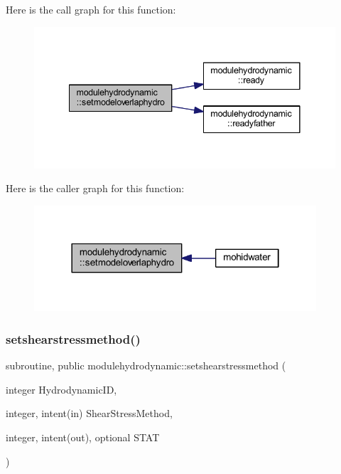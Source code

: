 Here is the call graph for this function\+:\nopagebreak
\begin{figure}[H]
\begin{center}
\leavevmode
\includegraphics[width=341pt]{namespacemodulehydrodynamic_abd4cedd7ee17aecf0de70d7616270033_cgraph}
\end{center}
\end{figure}
Here is the caller graph for this function\+:\nopagebreak
\begin{figure}[H]
\begin{center}
\leavevmode
\includegraphics[width=298pt]{namespacemodulehydrodynamic_abd4cedd7ee17aecf0de70d7616270033_icgraph}
\end{center}
\end{figure}
\mbox{\label{namespacemodulehydrodynamic_abc0b4b19014469e3102675a4dbffe103}} 
\subsubsection{\texorpdfstring{setshearstressmethod()}{setshearstressmethod()}}
{\footnotesize\ttfamily subroutine, public modulehydrodynamic\+::setshearstressmethod (\begin{DoxyParamCaption}\item[{integer}]{Hydrodynamic\+ID,  }\item[{integer, intent(in)}]{Shear\+Stress\+Method,  }\item[{integer, intent(out), optional}]{S\+T\+AT }\end{DoxyParamCaption})}

